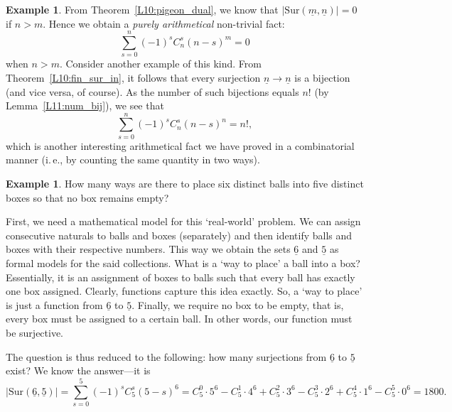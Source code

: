 \documentclass[12pt,notitlepage]{article}
\theoremstyle{plain}
\theoremstyle{definition}
\newtheorem{exm}[thm]{Example}
\theoremstyle{plain}
\newcommand{\ul}[1]{\underline{#1}}
\newcommand{\1}{\mathbf{1}}
\newcommand{\0}{\mathbf{0}}
\newcommand{\mcomm}[1]{}
\begin{document}
\begin{exm}
From Theorem~\ref{L10:pigeon_dual}, we know that $|\mathrm{Sur}(\ul{m}, \ul{n})| = 0$ if $n > m$. Hence we obtain a \emph{purely arithmetical} non-trivial fact:
$$\sum\limits_{s = 0}^{n} (-1)^{s} C_n^s (n-s)^m = 0$$
when $n > m$. Consider another example of this kind. From Theorem~\ref{L10:fin_sur_in}, it follows that every surjection $\ul{n} \to \ul{n}$ is a bijection (and vice versa, of course). As the number of such bijections equals $n!$ (by Lemma~\ref{L11:num_bij}), we see that
$$\sum\limits_{s = 0}^{n} (-1)^{s} C_n^s (n-s)^n = n!,$$
which is another interesting arithmetical fact we have proved in a combinatorial manner (i.\,e., by counting the same quantity in two ways).
\end{exm}

\mcomm{Sometimes, mathematical modeling of a ``real-world'' problem is non-trivial (and much more so for genuine \emph{real-world}) and the ``answer'' may depend on the model essentially. While the example below is straightforward in any respect, we urge the students to pay attention to modeling details. This will be especially important for probabilistic problems in  sections below.}

\begin{exm}
How many ways are there to place six distinct balls into five distinct boxes so that no box remains empty?

First, we need a mathematical model for this `real-world' problem. We can assign consecutive naturals to balls and boxes (separately) and then identify balls and boxes with their respective numbers. This way we obtain the sets $\ul{6}$ and $\ul{5}$ as formal models for the said collections. What is a `way to place' a ball into a box? Essentially, it is an assignment of boxes to balls such that every ball has exactly one box assigned. Clearly, functions capture this idea exactly. So, a `way to place' is just a function from $\ul{6}$ to $\ul{5}$. Finally, we require no box to be empty, that is, every box must be assigned to a certain ball. In other words, our function must be surjective.

The question is thus reduced to the following: how many surjections from $\ul{6}$ to $\ul{5}$ exist? We know the answer---it is
$$|\mathrm{Sur}(\ul{6}, \ul{5})| = \sum\limits_{s = 0}^{5} (-1)^{s} C_5^s (5-s)^6 = C_5^0 \cdot 5^6 - C_5^1 \cdot 4^6 + C_5^2 \cdot 3^6 - C_5^3 \cdot 2^6 + C_5^4 \cdot 1^6 - C_5^5 \cdot 0^6 = 1800.$$

\end{exm}
\end{document}
